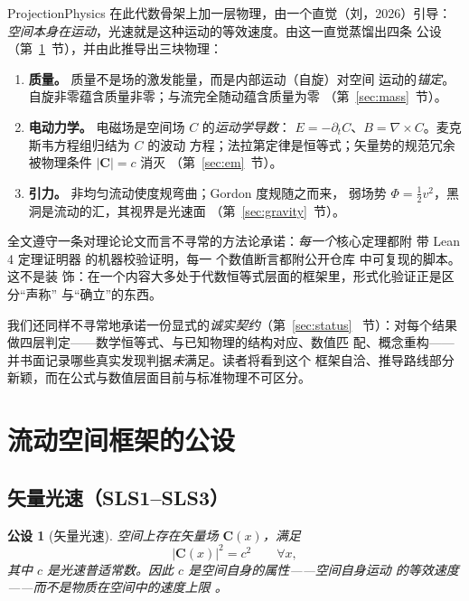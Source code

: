 \documentclass[aps,prd,preprint,superscriptaddress,amsmath,amssymb]{revtex4-2}
\newtheorem{postulate}{公设}[section]
\begin{document}
ProjectionPhysics 在此代数骨架上加一层物理，由一个直觉（刘，2026）引导：
\emph{空间本身在运动}，光速就是这种运动的等效速度。由这一直觉蒸馏出四条
公设（第~\ref{sec:postulates}~节），并由此推导出三块物理：

\begin{enumerate}
  \item \textbf{质量。} 质量不是场的激发能量，而是内部运动（自旋）对空间
  运动的\emph{锚定}。自旋非零蕴含质量非零；与流完全随动蕴含质量为零
  （第~\ref{sec:mass}~节）。
  \item \textbf{电动力学。} 电磁场是空间场 $C$ 的\emph{运动学导数}：
  $E=-\partial_t C$、$B=\nabla\times C$。麦克斯韦方程组归结为 $C$ 的波动
  方程；法拉第定律是恒等式；矢量势的规范冗余被物理条件 $|\bm{C}|=c$ 消灭
  （第~\ref{sec:em}~节）。
  \item \textbf{引力。} 非均匀流动使度规弯曲；Gordon 度规随之而来，
  弱场势 $\Phi=\frac12 v^2$，黑洞是流动的汇，其视界是光速面
  （第~\ref{sec:gravity}~节）。
\end{enumerate}

全文遵守一条对理论论文而言不寻常的方法论承诺：\emph{每一个}核心定理都附
带 Lean 4 定理证明器 \cite{deMoura2015,mathlib2020} 的机器校验证明，每一
个数值断言都附公开仓库 \cite{ProjectionPhysics} 中可复现的脚本。这不是装
饰：在一个内容大多处于代数恒等式层面的框架里，形式化验证正是区分``声称''
与``确立''的东西。

我们还同样不寻常地承诺一份显式的\emph{诚实契约}（第~\ref{sec:status}~
节）：对每个结果做四层判定——数学恒等式、与已知物理的结构对应、数值匹
配、概念重构——并书面记录哪些真实发现判据\emph{未}满足。读者将看到这个
框架自洽、推导路线部分新颖，而在公式与数值层面目前与标准物理不可区分。

\section{流动空间框架的公设}\label{sec:postulates}

\subsection{矢量光速（SLS1--SLS3）}

\begin{postulate}[矢量光速]
\label{post:sls1}
空间上存在矢量场 $\bm{C}(x)$，满足
\begin{equation}
|\bm{C}(x)|^2 = c^2 \qquad \forall x,
\end{equation}
其中 $c$ 是光速普适常数。因此 $c$ 是\emph{空间自身}的属性——空间自身运动
的等效速度——而不是物质\emph{在}空间中的速度上限 \cite{ProjectionPhysics-SLS}。
\end{postulate}
\end{document}

